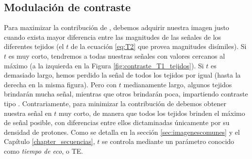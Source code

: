 \subsection{Modulación de contraste \Ttwo}
\label{sec:mod_contraste}
Para maximizar la contribución de \Ttwo, debemos adquirir nuestra imagen justo cuando exista mayor diferencia entre las magnitudes de las señales de los diferentes tejidos (el $t$ de la ecuación \ref{eq:T2} que provea magnitudes disímiles). Si $t$ es muy corto, tendremos a todas nuestras señales con valores cercanos al máximo (a la izquierda en la Figura \ref{fig:contraste_T1_tejidos}). Si $t$ es demasiado largo, hemos perdido la señal de todos los tejidos por igual (hasta la derecha en la misma figura). Pero con $t$ medianamente largo, algunos tejidos brindarán mucha señal, mientras que otros brindarán poca, impartiendo contraste tipo \Ttwo. Contrariamente, para minimizar la contribución de \Ttwo debemos obtener nuestra señal en $t$ muy corto, de manera que todos los tejidos brinden el máximo de señal posible, con diferencias entre ellos dictaminadas únicamente por su densidad de protones. Como se detalla en la sección \ref{sec:imagenescomunes} y el Capítulo \ref{chapter_secuencias}, $t$ se controla mediante un parámetro conocido como \textit{tiempo de eco}, o TE. 

